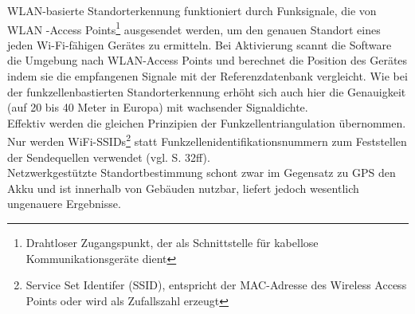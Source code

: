 \gls{WLAN}-basierte Standorterkennung funktioniert durch Funksignale, die von \gls{WLAN} -Access Points\footnote{ Drahtloser Zugangspunkt, der als Schnittstelle für kabellose Kommunikationsgeräte dient} ausgesendet werden, um den genauen Standort eines jeden Wi-Fi-fähigen Gerätes zu ermitteln. Bei Aktivierung scannt die Software die Umgebung nach \gls{WLAN}-Access Points und berechnet die Position des Gerätes indem sie die empfangenen Signale mit der Referenzdatenbank vergleicht. Wie bei der funkzellenbastierten Standorterkennung erhöht sich auch hier die Genauigkeit (auf 20 bis 40 Meter in Europa) mit wachsender Signaldichte. \\
Effektiv werden die gleichen Prinzipien der Funkzellentriangulation übernommen. Nur werden WiFi-SSIDs\footnote{ Service Set Identifer (SSID), entspricht der MAC-Adresse des Wireless Access Points oder wird als Zufallszahl erzeugt} statt Funkzellenidentifikationsnummern zum Feststellen der Sendequellen verwendet (vgl. \cite{gps} S. 32ff). \\
Netzwerkgestützte Standortbestimmung schont zwar im Gegensatz zu \gls{GPS} den Akku und ist innerhalb von Gebäuden nutzbar, liefert jedoch wesentlich ungenauere Ergebnisse.
